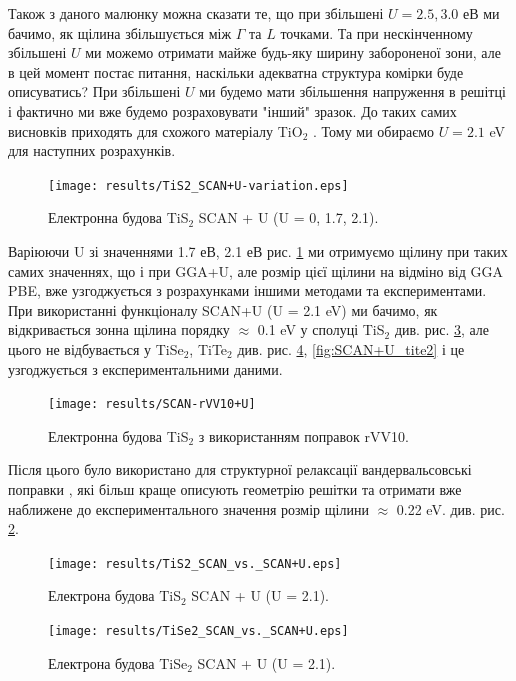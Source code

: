 Також з даного малюнку можна сказати те, що при збільшені $U=2.5, 3.0$ еВ ми бачимо, як щілина збільшується між $\Gamma$ та $L$ точками. Та при нескінченному збільшені $U$ ми можемо отримати майже будь-яку ширину забороненої зони, але в цей момент постає питання, наскільки адекватна структура комірки буде описуватись? При збільшені $U$ ми будемо мати збільшення напруження в решітці і фактично ми вже будемо розраховувати "інший" зразок. До таких самих висновків приходять для схожого матеріалу TiO$_2$ \cite{doi:10.1063/1.3617244}. Тому ми обираємо $U=2.1$ eV для наступних розрахунків.

\begin{figure}[H]
	\texttt{[image: results/TiS2\_SCAN+U-variation.eps]}
	\caption{Електронна будова TiS$_2$ SCAN + U (U = 0, 1.7, 2.1).}\label{fig:SCAN+U_1.7_2.1}
\end{figure}

Варіюючи U зі значеннями 1.7 еВ, 2.1 еВ рис. \ref{fig:SCAN+U_1.7_2.1} ми отримуємо щілину при таких самих значеннях, що і при GGA+U, але розмір цієї щілини на відміно від GGA PBE, вже узгоджується з розрахунками іншими методами та експериментами. При використанні функціоналу SCAN+U (U = 2.1 eV) ми бачимо, як відкривається зонна щілина порядку $\approx$ 0.1 eV у сполуці TiS$_2$ див. рис. \ref{fig:SCAN+U_tis2}, але цього не відбувається у TiSe$_2$, TiTe$_2$ див. рис. \ref{fig:SCAN+U_tise2}, \ref{fig:SCAN+U_tite2} і це узгоджується з експериментальними даними.

\begin{figure}[H]
	\texttt{[image: results/SCAN-rVV10+U]}
	\caption{Електронна будова TiS$_2$ з використанням поправок rVV10.}\label{fig:rVV10+U}
\end{figure}

Після цього було використано для структурної релаксації вандервальсовські поправки \cite{Peng_2016}, які більш краще описують геометрію решітки та отримати вже наближене до експериментального значення розмір щілини $\approx$ 0.22 eV. див. рис. \ref{fig:rVV10+U}.

\begin{figure}
	\texttt{[image: results/TiS2\_SCAN\_vs.\_SCAN+U.eps]}
	\caption{Електрона будова TiS$_2$ SCAN + U (U = 2.1).}\label{fig:SCAN+U_tis2}
\end{figure}

\begin{figure}
	\texttt{[image: results/TiSe2\_SCAN\_vs.\_SCAN+U.eps]}
	\caption{Електрона будова TiSe$_2$ SCAN + U (U = 2.1).}\label{fig:SCAN+U_tise2}
\end{figure}

